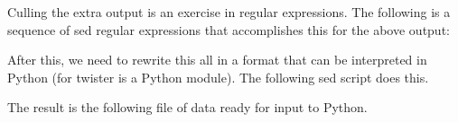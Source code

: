 \documentclass{article}%
\theoremstyle{plain}
\theoremstyle{plain}
\theoremstyle{definition}
\numberwithin{equation}{section}
\begin{document}
Culling the extra output is an exercise in regular
expressions. The following is a sequence of {\Tt{}sed\nwendquote}
regular expressions that accomplishes this
for the above output:
\nwenddocs{}\endmoddef\nwstartdeflinemarkup\nwenddeflinemarkup

\nwendcode{}\nwdocspar
After this, we need to rewrite this all in a format
that can be interpreted in Python (for {\Tt{}twister\nwendquote} is
a Python module). The following {\Tt{}sed\nwendquote} script does this.
\nwenddocs{}\endmoddef\nwstartdeflinemarkup\nwenddeflinemarkup

\nwendcode{}\nwdocspar
The result is the following file of data ready
for input to Python.
\nwenddocs{}\endmoddef\nwstartdeflinemarkup\nwenddeflinemarkup

\nwendcode{}\nwdocspar
\end{document}
